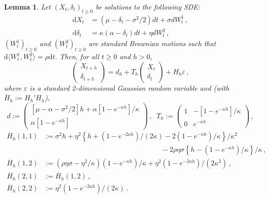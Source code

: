 \documentclass[nolayout]{article}
\theoremstyle{plain}
\newtheorem{lemma}[lemma]{Lemma}
\theoremstyle{definition}
\newcommand{\1}{\mathbbm{1}}
\def\rmd{\mathrm{d}}
\def\barH{\overline{H}}
\def\eqsp{\,}
\newcommand{\eqdef}{\ensuremath{:=}}
\begin{document}
\begin{lemma}
\label{lem:integratedSDE}
Let $(X_t,\delta_t)_{t\ge0}$ be solutions to the following SDE:
\begin{align*}
\rmd X_t &= \left(\mu - \delta_t- \sigma^2/2 \right) dt + \sigma d W^1_t \eqsp,\\
\rmd \delta_t &= \kappa\left( \alpha - \delta_t\right)dt + \eta dW^2_t \eqsp,
\end{align*}
$(W_t^1)_{t\ge 0}$ and $(W_t^2)_{t\ge 0}$ are standard Brownian motions such that $\rmd \langle W_t^1,W_t^2 \rangle = \rho\rmd t$.
Then, for all $t\ge 0$ and $h>0$,
\[
\begin{pmatrix} X_{t+h} \\ \delta_{t+h}\end{pmatrix} = d_h + T_h\begin{pmatrix} X_{t} \\ \delta_{t}\end{pmatrix} + H_h\varepsilon\eqsp,
\]
where $\varepsilon$ is a standard 2-dimensional Gaussian random variable and (with $\barH_h\eqdef H_h'H_h$),
\[
d \eqdef
\begin{pmatrix} \left[\mu- \alpha - \sigma^2/2 \right] h + \alpha[1-e^{-\kappa h}]/\kappa\\
\alpha [1-e^{-\kappa h}] \end{pmatrix}\eqsp, \;\; T_h \eqdef
\begin{pmatrix} 1 & -[1-e^{-\kappa h}]/\kappa \\ 0 & e^{-\kappa h} \end{pmatrix} \eqsp,
\]
\begin{align*}
\barH_h(1,1) & \eqdef \sigma^2 h+ \eta^2\left\{h + (1-e^{-2\kappa h})/(2\kappa) - 2(1-e^{-\kappa h})/\kappa  \right\}/\kappa^2 \\
&\hspace{7cm} -2\rho\eta\sigma\left\{h - (1-e^{-\kappa h})/\kappa \right\}/\kappa\eqsp, \\
\barH_h(1,2) & \eqdef \left(\rho \eta \sigma-\eta^2/\kappa\right)\left(1-e^{-\kappa h} \right)/\kappa + \eta^2\left(1-e^{-2\kappa h} \right)/(2\kappa^2)\eqsp,\\
\barH_h(2,1) & \eqdef \barH_h(1,2)\eqsp,\\
\barH_h(2,2) & \eqdef \eta^2\left( 1-e^{-2\kappa h} \right)/(2\kappa)\eqsp.
\end{align*}
\end{lemma}
\end{document}
